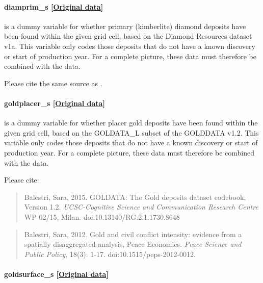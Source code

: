 \documentclass[]{book}
\begin{document}
\paragraph{diamprim\_s
{[}\href{https://www.prio.org/Data/Geographical-and-Resource-Datasets/Diamond-Resources/}{Original
data}{]}}\label{diamprim-s}

is a dummy variable for whether primary (kimberlite) diamond deposits
have been found within the given grid cell, based on the Diamond
Resources dataset v1a. This variable only codes those deposits that do
not have a known discovery or start of production year. For a complete
picture, these data must therefore be combined with the
 data.

Please cite the same source as .

\paragraph{goldplacer\_s
{[}\href{http://www.researchgate.net/profile/Sara_Balestri}{Original
data}{]}}\label{goldplacer-s}

is a dummy variable for whether placer gold deposits have been found
within the given grid cell, based on the GOLDATA\_L subset of the
GOLDDATA v1.2. This variable only codes those deposits that do not have
a known discovery or start of production year. For a complete picture,
these data must therefore be combined with the 
data.

Please cite:

\begin{quote}
Balestri, Sara, 2015. GOLDATA: The Gold deposits dataset codebook,
Version 1.2. \emph{UCSC-Cognitive Science and Communication Research Centre}
WP 02/15, Milan. doi:10.13140/RG.2.1.1730.8648
\end{quote}

\begin{quote}
Balestri, Sara, 2012. Gold and civil conflict intensity: evidence from a
spatially disaggregated analysis, Peace Economics. \emph{Peace Science
and Public Policy}, 18(3): 1-17. doi:10.1515/peps-2012-0012.
\end{quote}

\paragraph{goldsurface\_s
{[}\href{http://www.researchgate.net/profile/Sara_Balestri}{Original
data}{]}}\label{goldsurface-s}
\end{document}
